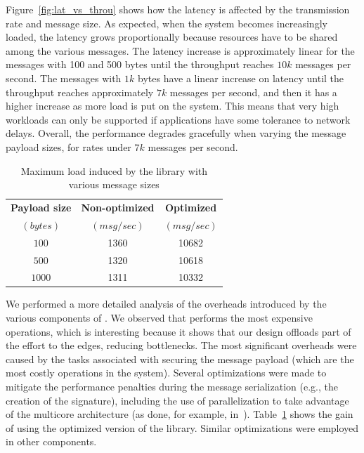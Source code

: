Figure~\ref{fig:lat_vs_throu} shows how the latency is affected by the transmission rate and message size.
As expected, when the system becomes increasingly loaded, the latency grows proportionally because resources have to be shared among the various messages.
The latency increase is approximately linear for the messages with 100 and 500 bytes until the throughput reaches $10k$ messages per second.
The messages with $1k$ bytes have a linear increase on latency until the throughput reaches approximately $7k$ messages per second, and then it has a higher increase as more load is put on the system.
This means that very high workloads can only be supported if applications have some tolerance to network delays.
Overall, the performance degrades gracefully when varying the message payload sizes, for rates under $7k$ messages per second.


\begin{table}[t]
\begin{center}
{\small
\begin{tabular}{c c c}\hline\hline
\textbf{Payload size } & \textbf{Non-optimized}  & \textbf{Optimized}   \\
\textbf{$(bytes)$} & \textbf{$(msg/sec)$} & \textbf{$(msg/sec)$}  \\\hline
$100  $ & 1360 & 10682 \\
$500  $ & 1320 & 10618 \\
$1000 $ & 1311 & 10332  \\
\hline\hline
\end{tabular}
}
\caption{Maximum load induced by the \sender library with various message sizes\label{tab:client_evaluation}}
\end{center}
\end{table}

We performed a more detailed analysis of the overheads introduced by the various components of \sieveq.
We observed that \sender performs the most expensive operations, which is interesting because it shows that our design offloads part of the effort to the edges, reducing bottlenecks.
The most significant overheads were caused by the tasks associated with securing the message payload (which are the most costly operations in the system). Several optimizations were made to mitigate the performance penalties during the message serialization (e.g., the creation of the signature), including the use of parallelization to take advantage of the multicore architecture (as done, for example, in~\cite{Kirsch:2014}).
Table~\ref{tab:client_evaluation} shows the gain of using the optimized version of the \sender library. 
Similar optimizations were employed in other components.



